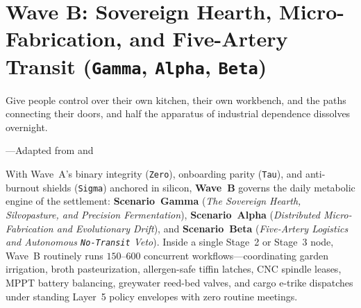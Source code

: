 \chapter{Wave B: Sovereign Hearth, Micro-Fabrication, and Five-Artery Transit (\texttt{Gamma}, \texttt{Alpha}, \texttt{Beta})}
\label{ch:l5-wave-b}

\epigraph{Give people control over their own kitchen, their own workbench, and the paths connecting their doors, and half the apparatus of industrial dependence dissolves overnight.}{---Adapted from \textcite{illich1973} and \textcite{kropotkin1902}}

With Wave~A's binary integrity (\texttt{Zero}), onboarding parity (\texttt{Tau}), and anti-burnout
shields (\texttt{Sigma}) anchored in silicon, \textbf{Wave~B} governs the daily metabolic engine of
the settlement: \textbf{Scenario~Gamma} (\textit{The Sovereign Hearth, Silvopasture, and Precision
Fermentation}), \textbf{Scenario~Alpha} (\textit{Distributed Micro-Fabrication and Evolutionary
Drift}), and \textbf{Scenario~Beta} (\textit{Five-Artery Logistics and Autonomous \texttt{No-Transit}
Veto}). Inside a single Stage~2 or Stage~3 node, Wave~B routinely runs $150\text{--}600$ concurrent
workflows---coordinating garden irrigation, broth pasteurization, allergen-safe tiffin latches, CNC
spindle leases, MPPT battery balancing, greywater reed-bed valves, and cargo e-trike dispatches
under standing Layer~5 policy envelopes with zero routine meetings.

